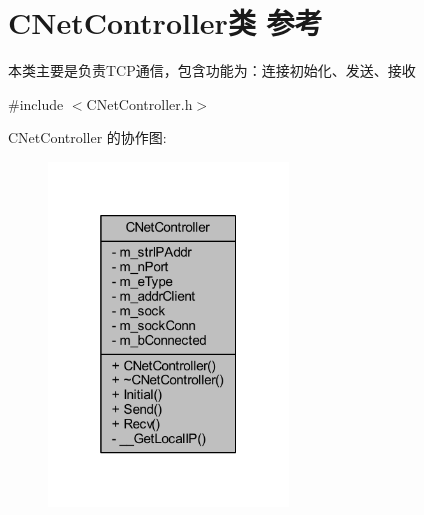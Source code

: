 \hypertarget{class_c_net_controller}{}\section{C\+Net\+Controller类 参考}
\label{class_c_net_controller}


本类主要是负责\+T\+C\+P通信，包含功能为：连接初始化、发送、接收  




{\ttfamily \#include $<$C\+Net\+Controller.\+h$>$}



C\+Net\+Controller 的协作图\+:\nopagebreak
\begin{figure}[H]
\begin{center}
\leavevmode
\includegraphics[width=181pt]{class_c_net_controller__coll__graph}
\end{center}
\end{figure}
